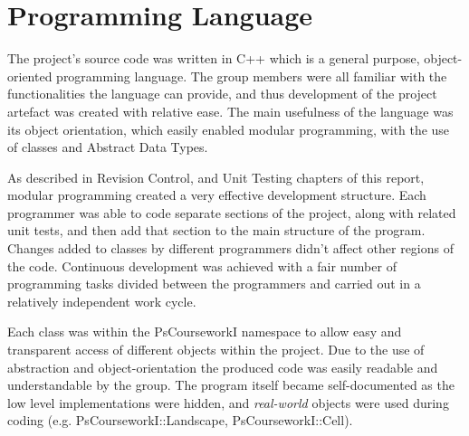 \section{Programming Language}
\label{Programming Language}
The project's source code was written in C++ which is a general purpose, object-oriented programming language. The group members were all familiar with the functionalities the language can provide, and thus development of the project artefact was created with relative ease. The main usefulness of the language was its object orientation, which easily enabled modular programming, with the use of classes and Abstract Data Types. 

As described in Revision Control, and Unit Testing chapters of this report, modular programming created a very effective development structure. Each programmer was able to code separate sections of the project, along with related unit tests, and then add that section to the main structure of the program. Changes added to classes by different programmers didn't affect other regions of the code. Continuous development was achieved with a fair number of programming tasks divided between the programmers and carried out in a relatively independent work cycle.

Each class was within the PsCourseworkI namespace to allow easy and transparent access of different objects within the project. Due to the use of abstraction and object-orientation the produced code was easily readable and understandable by the group. The program itself became self-documented as the low level implementations were hidden, and \textit{real-world} objects were used during coding (e.g. PsCourseworkI::Landscape, PsCourseworkI::Cell).
